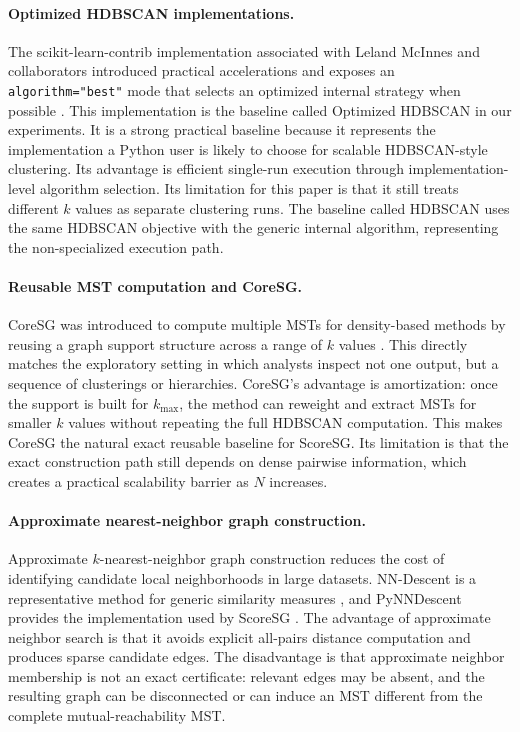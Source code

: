 \documentclass[11pt]{article}
\begin{document}
\paragraph{Optimized HDBSCAN implementations.}
The scikit-learn-contrib implementation associated with Leland McInnes and collaborators introduced practical accelerations and exposes an \texttt{algorithm="best"} mode that selects an optimized internal strategy when possible \citep{mcinnes2017accelerated,hdbscansoftware}. This implementation is the baseline called Optimized HDBSCAN in our experiments. It is a strong practical baseline because it represents the implementation a Python user is likely to choose for scalable HDBSCAN-style clustering. Its advantage is efficient single-run execution through implementation-level algorithm selection. Its limitation for this paper is that it still treats different \(k\) values as separate clustering runs. The baseline called HDBSCAN uses the same HDBSCAN objective with the generic internal algorithm, representing the non-specialized execution path.

\paragraph{Reusable MST computation and CoreSG.}
CoreSG was introduced to compute multiple MSTs for density-based methods by reusing a graph support structure across a range of \(k\) values \citep{araujo2022coresg}. This directly matches the exploratory setting in which analysts inspect not one output, but a sequence of clusterings or hierarchies. CoreSG's advantage is amortization: once the support is built for \(k_{\max}\), the method can reweight and extract MSTs for smaller \(k\) values without repeating the full HDBSCAN computation. This makes CoreSG the natural exact reusable baseline for ScoreSG. Its limitation is that the exact construction path still depends on dense pairwise information, which creates a practical scalability barrier as \(N\) increases.

\paragraph{Approximate nearest-neighbor graph construction.}
Approximate \(k\)-nearest-neighbor graph construction reduces the cost of identifying candidate local neighborhoods in large datasets. NN-Descent is a representative method for generic similarity measures \citep{dong2011efficient}, and PyNNDescent provides the implementation used by ScoreSG \citep{pynndescentdocs}. The advantage of approximate neighbor search is that it avoids explicit all-pairs distance computation and produces sparse candidate edges. The disadvantage is that approximate neighbor membership is not an exact certificate: relevant edges may be absent, and the resulting graph can be disconnected or can induce an MST different from the complete mutual-reachability MST.
\end{document}
